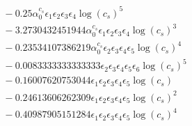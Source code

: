 \documentclass[10pt]{article}
\begin{document}
\begin{align*}
&{}  - 0.25 \alpha_{0}^{c_s} \epsilon_{1} \epsilon_{2} \epsilon_{3} \epsilon_{4} \log{\left(c_{s} \right)}^{5} \\
&{}  - 3.2730432451944 \alpha_{0}^{c_s} \epsilon_{1} \epsilon_{2} \epsilon_{3} \epsilon_{4} \log{\left(c_{s} \right)}^{3} \\
&{}  - 0.23534107386219 \alpha_{0}^{c_s} \epsilon_{2} \epsilon_{3} \epsilon_{4} \epsilon_{5} \log{\left(c_{s} \right)}^{4} \\
&{}  - 0.0083333333333333 \epsilon_{2} \epsilon_{3} \epsilon_{4} \epsilon_{5} \epsilon_{6} \log{\left(c_{s} \right)}^{5} \\
&{}  - 0.16007620753044 \epsilon_{1} \epsilon_{2} \epsilon_{3} \epsilon_{4} \epsilon_{5} \log{\left(c_{s} \right)} \\
&{}  - 0.24613606262309 \epsilon_{1} \epsilon_{2} \epsilon_{3} \epsilon_{4} \epsilon_{5} \log{\left(c_{s} \right)}^{2} \\
&{}  - 0.40987905151284 \epsilon_{1} \epsilon_{2} \epsilon_{3} \epsilon_{4} \epsilon_{5} \log{\left(c_{s} \right)}^{4}
\end{align*}
\end{document}

